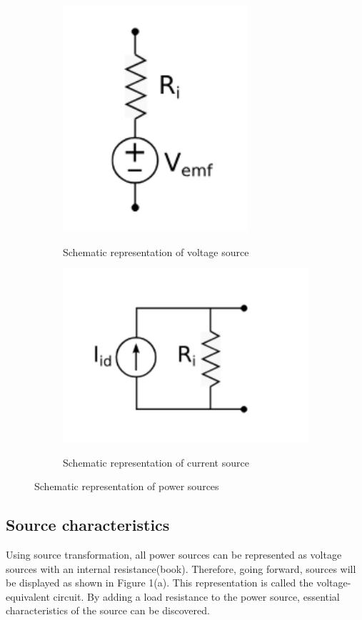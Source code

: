 \documentclass[a4paper]{article}
\begin{document}
\begin{figure}[!ht]
    \centering
    \begin{subfigure}{0.5\textwidth}
        \centering
        \includegraphics[width = 0.5 \linewidth]{Voltagesource.png}
        \label{fig:1a}
        \caption{Schematic representation of voltage source}
    \end{subfigure}%
    \begin{subfigure}{0.5\textwidth}
        \centering
        \includegraphics[width = 0.7\linewidth]{Currentsource.png}        
        \label{fig:1b}
        \caption{Schematic representation of current source}
    \end{subfigure}
    \label{fig:1}
    \caption{Schematic representation of power sources}  
\end{figure}

\subsection{Source characteristics}
Using source transformation, all power sources can be represented as voltage
sources with an internal resistance(book). Therefore, going forward, sources
will be displayed as shown in Figure 1(a). This representation is called the
voltage-equivalent circuit. By adding a load resistance to the power source, essential characteristics of
the source can be discovered.
\end{document}
